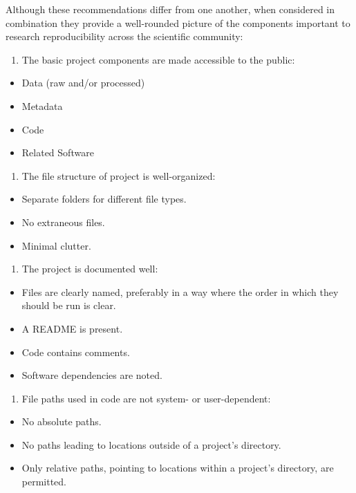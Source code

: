 \documentclass[12pt,twoside]{reedthesis}
\providecommand{\tightlist}{%
  \setlength{\itemsep}{0pt}\setlength{\parskip}{0pt}}
\begin{document}
Although these recommendations differ from one another, when considered in combination they provide a well-rounded picture of the components important to research reproducibility across the scientific community:
\begin{enumerate}
\def\labelenumi{\arabic{enumi}.}
\tightlist
\item
  The basic project components are made accessible to the public:
\end{enumerate}
\begin{itemize}
\tightlist
\item
  Data (raw and/or processed)
\item
  Metadata
\item
  Code
\item
  Related Software
\end{itemize}
\begin{enumerate}
\def\labelenumi{\arabic{enumi}.}
\setcounter{enumi}{1}
\tightlist
\item
  The file structure of project is well-organized:
\end{enumerate}
\begin{itemize}
\tightlist
\item
  Separate folders for different file types.
\item
  No extraneous files.
\item
  Minimal clutter.
\end{itemize}
\begin{enumerate}
\def\labelenumi{\arabic{enumi}.}
\setcounter{enumi}{2}
\tightlist
\item
  The project is documented well:
\end{enumerate}
\begin{itemize}
\tightlist
\item
  Files are clearly named, preferably in a way where the order in which they should be run is clear.
\item
  A README is present.
\item
  Code contains comments.
\item
  Software dependencies are noted.
\end{itemize}
\begin{enumerate}
\def\labelenumi{\arabic{enumi}.}
\setcounter{enumi}{3}
\tightlist
\item
  File paths used in code are not system- or user-dependent:
\end{enumerate}
\begin{itemize}
\tightlist
\item
  No absolute paths.
\item
  No paths leading to locations outside of a project's directory.
\item
  Only relative paths, pointing to locations within a project's directory, are permitted.
\end{itemize}
\end{document}
